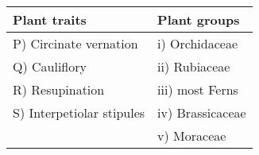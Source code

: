 \begin{center}
\begin{tabular}{|l|l|}
\hline
\textbf{Plant traits} & \textbf{Plant groups} \\
\hline
P) Circinate vernation & i) Orchidaceae \\
Q) Cauliflory & ii) Rubiaceae \\
R) Resupination & iii) most Ferns \\
S) Interpetiolar stipules & iv) Brassicaceae \\
~ & v) Moraceae \\
\hline
\end{tabular}
\end{center}